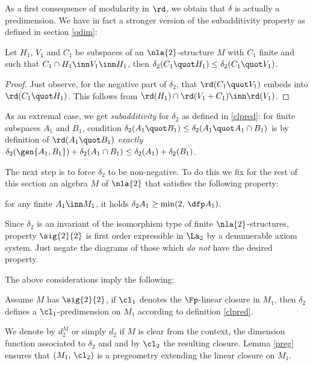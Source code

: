 As a first consequence of modularity in $\rd$, we obtain that $\delta$ is actually a predimension. We have in fact
a stronger version of the subadditivity property as defined in section \ref{qdim}:

\begin{lem}\label{2transmogrifer}
Let $H_{1},\,V_{1}$ and $C_{1}$ be subspaces of an $\nla{2}$-structure $M$ with $C_{1}$ finite and such that $C_{1}\cap H_{1}\inn V_{1}\inn H_{1}$,
then $\delta_{2}(C_{1}\quot H_{1})\leq\delta_{2}(C_{1}\quot V_{1})$.
\end{lem}
\begin{proof}
Just observe, for the negative part of $\delta_{2}$, that $\rd(C_{1}\quot V_{1})$ embeds into
$\rd(C_{1}\quot H_{1})$. This follows from $\rd(H_{1})\cap \rd(V_{1}+C_{1})\inn \rd(V_{1})$.
\end{proof}
As an extremal case, we get \emph{subadditivity} for $\delta_{2}$ as defined in \ref{clpred}: for
finite subspaces $A_{1}$ and $B_{1}$, condition $\delta_{2}(A_{1}\quot B_{1})\leq\delta_{2}(A_{1}\quot A_{1}\cap B_{1})$
is by definition of $\rd(A_{1}\quot B_{1})$ {\em exactly} $\delta_{2}(\gen{A_{1},B_{1}})+\delta_{2}(A_{1}\cap B_{1})\leq\delta_{2}(A_{1})+\delta_{2}(B_{1})$.

The next step is to force $\delta_{2}$ to be non-negative. To do this we fix
for the rest of this section an algebra $M$ of $\nla{2}$ that satisfies
the following property:
\begin{itemize}
for any finite
$A_{1}\inn M_{1}$, it
holds $\delta_{2}A_{1}\geq\min(2,\,\dfp A_{1})$.
\end{itemize}
Since $\delta_{2}$ is an invariant of
the isomorphism type of finite $\nla{2}$-structures, property $\sig{2}{2}$ is first order expressible in
$\La_{2}$ by a denumerable axiom system. Just negate the diagrams of those which \emph{do not}
have the desired property.

The above considerations imply the following:
\begin{prop}\label{preg2}
Assume $M$ has $\sig{2}{2}$, if $\cl_{1}$ denotes the $\Fp$-linear closure in $M_{1}$, then
$\delta_{2}$ defines a $\cl_{1}$-predimension on $M_{1}$ according to definition \ref{clpred}.
\end{prop}
We denote by $d_{2}^{M}$ or simply $d_{2}$ if $M$ is clear from the context, the dimension function associated to $\delta_{2}$ and and by $\cl_{2}$ the resulting closure.
Lemma \ref{preg} ensures that $(M_{1},\,\cl_{2})$ is a pregeometry extending the linear closure on $M_{1}$.

